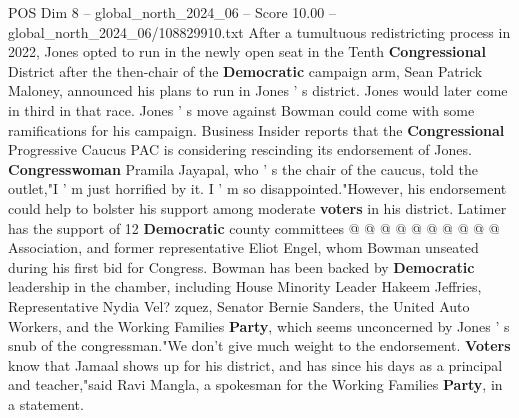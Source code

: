 \begin{textsample}{POS Dim 8 – global\_north\_2024\_06 – Score 10.00 – global\_north\_2024\_06/108829910.txt}
After a tumultuous redistricting process in 2022, Jones opted to run in the newly open seat in the Tenth \textbf{Congressional} District after the then-chair of the \textbf{Democratic} campaign arm, Sean Patrick Maloney, announced his plans to run in Jones ' s district.
Jones would later come in third in that race.
Jones ' s move against Bowman could come with some ramifications for his campaign.
Business Insider reports that the \textbf{Congressional} Progressive Caucus PAC is considering rescinding its endorsement of Jones. \textbf{Congresswoman} Pramila Jayapal, who ' s the chair of the caucus, told the outlet,"I ' m just horrified by it.
I ' m so disappointed."However, his endorsement could help to bolster his support among moderate \textbf{voters} in his district.
Latimer has the support of 12 \textbf{Democratic} county committees @ @ @ @ @ @ @ @ @ @ Association, and former representative Eliot Engel, whom Bowman unseated during his first bid for Congress.
Bowman has been backed by \textbf{Democratic} leadership in the chamber, including House Minority Leader Hakeem Jeffries, Representative Nydia Vel? zquez, Senator Bernie Sanders, the United Auto Workers, and the Working Families \textbf{Party}, which seems unconcerned by Jones ' s snub of the congressman."We don't give much weight to the endorsement. \textbf{Voters} know that Jamaal shows up for his district, and has since his days as a principal and teacher,"said Ravi Mangla, a spokesman for the Working Families \textbf{Party}, in a statement.

\end{textsample}
